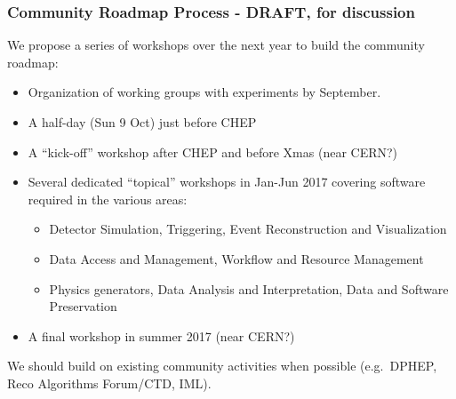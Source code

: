 \begin{frame}
\frametitle{Community Roadmap Process - DRAFT, for discussion}

We propose a series of workshops over the next year to build the community roadmap:

\begin{itemize}
\item Organization of working groups with experiments by September.
\item A half-day (Sun 9 Oct) just before CHEP 
\item A ``kick-off'' workshop after CHEP and before Xmas (near CERN?)
\item Several dedicated ``topical'' workshops in Jan-Jun 2017 covering software required in the various areas:
\begin{itemize}
\item Detector Simulation, Triggering, Event Reconstruction and Visualization
\item Data Access and Management, Workflow and Resource Management
\item Physics generators, Data Analysis and Interpretation, Data and Software Preservation
\end{itemize}
\item A final workshop in summer 2017 (near CERN?)
\end{itemize}

We should build on existing community activities when possible (e.g.\ DPHEP, Reco Algorithms Forum/CTD, IML). 

\end{frame}



